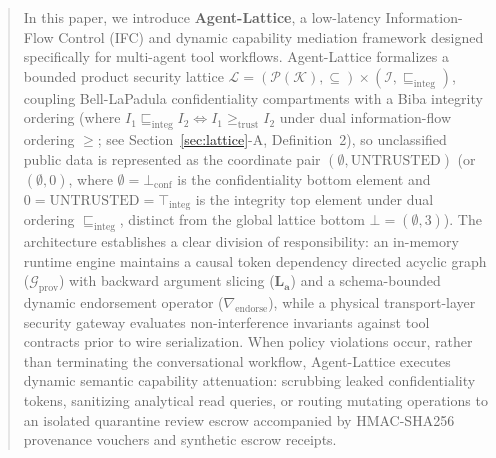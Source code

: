 \documentclass[conference,10pt]{IEEEtran}
\begin{document}
\begin{abstract}
In this paper, we introduce \textbf{Agent-Lattice}, a low-latency Information-Flow Control (IFC) and dynamic capability mediation framework designed specifically for multi-agent tool workflows. Agent-Lattice formalizes a bounded product security lattice $\mathcal{L} = (\mathcal{P}(\mathcal{K}), \subseteq) \times (\mathcal{I}, \sqsubseteq_{\text{integ}})$, coupling Bell-LaPadula confidentiality compartments with a Biba integrity ordering (where $I_1 \sqsubseteq_{\text{integ}} I_2 \iff I_1 \ge_{\text{trust}} I_2$ under dual information-flow ordering $\ge$; see Section~\ref{sec:lattice}-A, Definition~2), so unclassified public data is represented as the coordinate pair $(\emptyset, \text{UNTRUSTED})$ (or $(\emptyset, 0)$, where $\emptyset = \bot_{\text{conf}}$ is the confidentiality bottom element and $0 = \text{UNTRUSTED} = \top_{\text{integ}}$ is the integrity top element under dual ordering $\sqsubseteq_{\text{integ}}$, distinct from the global lattice bottom $\bot = (\emptyset, 3)$). The architecture establishes a clear division of responsibility: an in-memory runtime engine maintains a causal token dependency directed acyclic graph ($\mathcal{G}_{\text{prov}}$) with backward argument slicing ($\mathbf{L}_{\mathbf{a}}$) and a schema-bounded dynamic endorsement operator ($\nabla_{\text{endorse}}$), while a physical transport-layer security gateway evaluates non-interference invariants against tool contracts prior to wire serialization. When policy violations occur, rather than terminating the conversational workflow, Agent-Lattice executes dynamic semantic capability attenuation: scrubbing leaked confidentiality tokens, sanitizing analytical read queries, or routing mutating operations to an isolated quarantine review escrow accompanied by HMAC-SHA256 provenance vouchers and synthetic escrow receipts.


\end{abstract}
\end{document}
